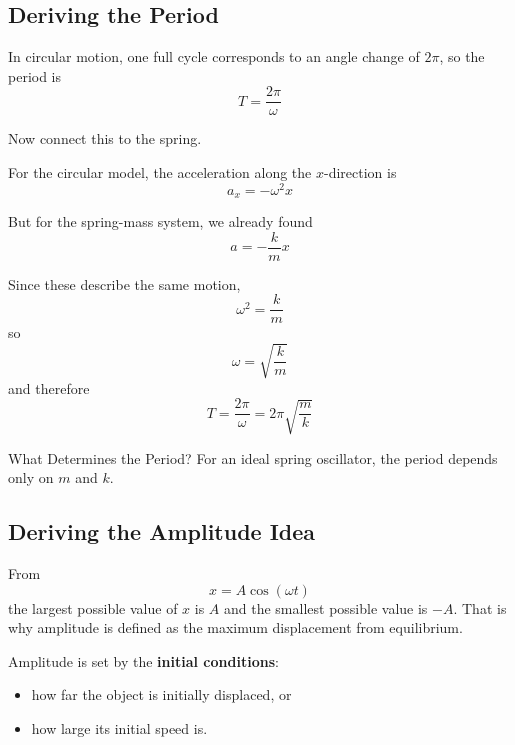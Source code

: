 \subsection*{Deriving the Period}
In circular motion, one full cycle corresponds to an angle change of $2\pi$, so the period is
\begin{equation}
    T = \frac{2\pi}{\omega}
\end{equation}

Now connect this to the spring.

For the circular model, the acceleration along the $x$-direction is
\begin{equation}
    a_x = -\omega^2 x
\end{equation}

But for the spring-mass system, we already found
\begin{equation}
    a = -\frac{k}{m}x
\end{equation}

Since these describe the same motion,
\begin{equation}
    \omega^2 = \frac{k}{m}
\end{equation}
so
\begin{equation}
    \omega = \sqrt{\frac{k}{m}}
\end{equation}
and therefore
\begin{equation}
    T = \frac{2\pi}{\omega} = 2\pi\sqrt{\frac{m}{k}}
\end{equation}

\begin{keyidea}{What Determines the Period?}
For an ideal spring oscillator, the period depends only on $m$ and $k$.
\end{keyidea}

\subsection*{Deriving the Amplitude Idea}
From
\begin{equation}
    x = A\cos(\omega t)
\end{equation}
the largest possible value of $x$ is $A$ and the smallest possible value is $-A$. That is why amplitude is defined as the maximum displacement from equilibrium.

Amplitude is set by the \textbf{initial conditions}:
\begin{itemize}
    \item how far the object is initially displaced, or
    \item how large its initial speed is.
\end{itemize}

